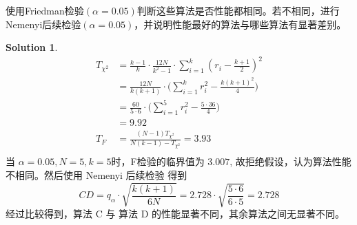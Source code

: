 \documentclass[a4paper,UTF8]{article}
\theoremstyle{definition}
\newtheorem*{solution}{Solution}
\begin{document}
使用Friedman检验$(\alpha=0.05)$判断这些算法是否性能都相同。若不相同，进行Nemenyi后续检验$(\alpha=0.05)$，并说明性能最好的算法与哪些算法有显著差别。
\begin{solution}
\[ 
\begin{split}
T_{\chi ^2} &= \frac{k-1}{k} \cdot \frac{12N}{k^2-1}\cdot \sum^{k}_{i=1}(r_i - \frac{k+1}{2})^2 \\
&= \frac{12N} {k(k+1)} \cdot \big ( \sum^k_{i=1} r_i^2 - \frac{k(k+1)^2}{4} \big ) \\
&= \frac{60} {5 \cdot 6} \cdot \big ( \sum^5_{i=1} r_i^2 - \frac{5 \cdot 36}{4} \big ) \\
&= 9.92 \\
T_{F} &= \frac{(N-1)T_{\chi ^2} }{N(k-1)-T_{\chi ^2} }  = 3.93 \\
\end{split}
\]
当 $\alpha = 0.05, N = 5, k = 5$时，F检验的临界值为 $3.007$, 故拒绝假设，认为算法性能不相同。然后使用 Nemenyi 后续检验 得到 \\
 $$ CD = q_{\alpha} \cdot \sqrt{\frac{k(k+1)}{6N}} = 2.728  \cdot \sqrt{\frac{5 \cdot 6}{6 \cdot 5}} = 2.728 $$
 经过比较得到，算法 C 与 算法 D 的性能显著不同，其余算法之间无显著不同。



\end{solution}
\end{document}
